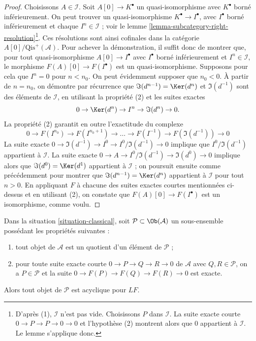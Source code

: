 \begin{proof}
Choisissons $A \in \mathcal{I}$. Soit $A[0] \to K^\bullet$ un
quasi-isomorphisme avec $K^\bullet$ borné inférieurement. On peut trouver un
quasi-isomorphisme $K^\bullet \to I^\bullet$, avec $I^\bullet$ borné
inférieurement et chaque $I^n \in \mathcal{I}$ ; voir le
lemme \ref{lemma-subcategory-right-resolution}\footnote{D'après (1),
$\mathcal{I}$ n'est pas vide. Choisissons $P$ dans $\mathcal{I}$. La suite
exacte courte $0 \to P \to P \to 0 \to 0$ et l'hypothèse (2) montrent alors
que $0$ appartient à $\mathcal{I}$. Le lemme s'applique donc.}. Ces résolutions
sont ainsi cofinales dans la catégorie
$A[0]/\text{Qis}^{+}(\mathcal{A})$. Pour achever la démonstration, il suffit
donc de montrer que, pour tout quasi-isomorphisme
$A[0] \to I^\bullet$ avec $I^\bullet$ borné inférieurement et
$I^n \in \mathcal{I}$, le morphisme
$F(A)[0] \to F(I^\bullet)$ est un quasi-isomorphisme.
Supposons pour cela que $I^n = 0$ pour $n < n_0$. On peut évidemment supposer
que $n_0 < 0$. À partir de $n = n_0$, on démontre par récurrence que
$\Im(d^{n - 1}) = \Ker(d^n)$ et $\Im(d^{-1})$ sont des éléments de
$\mathcal{I}$, en utilisant la propriété (2) et les suites exactes
$$
0 \to \Ker(d^n) \to I^n \to \Im(d^n) \to 0.
$$
La propriété (2) garantit en outre l'exactitude du complexe
$$
0 \to F(I^{n_0}) \to F(I^{n_0 + 1}) \to \ldots \to F(I^{-1}) \to
F(\Im(d^{-1})) \to 0
$$
La suite exacte
$0 \to \Im(d^{-1}) \to I^0 \to I^0/\Im(d^{-1}) \to 0$ implique que
$I^0/\Im(d^{-1})$ appartient à $\mathcal{I}$. La suite exacte
$0 \to A \to I^0/\Im(d^{-1}) \to \Im(d^0) \to 0$ implique alors que
$\Im(d^0) = \Ker(d^1)$ appartient à $\mathcal{I}$ ; on poursuit ensuite comme
précédemment pour montrer que
$\Im(d^{n - 1}) = \Ker(d^n)$ appartient à $\mathcal{I}$ pour tout $n > 0$.
En appliquant $F$ à chacune des suites exactes courtes mentionnées ci-dessus et
en utilisant (2), on constate que
$F(A)[0] \to F(I^\bullet)$ est un isomorphisme, comme voulu.
\end{proof}

\begin{lemma}
\label{lemma-subcategory-left-acyclics}
Dans la situation \ref{situation-classical}, soit
$\mathcal{P} \subset \Ob(\mathcal{A})$ un sous-ensemble possédant les
propriétés suivantes :
\begin{enumerate}
\item tout objet de $\mathcal{A}$ est un quotient d'un élément de
$\mathcal{P}$ ;
\item pour toute suite exacte courte $0 \to P \to Q \to R \to 0$ de
$\mathcal{A}$ avec $Q, R \in \mathcal{P}$, on a $P \in \mathcal{P}$ et la
suite $0 \to F(P) \to F(Q) \to F(R) \to 0$ est exacte.
\end{enumerate}
Alors tout objet de $\mathcal{P}$ est acyclique pour $LF$.
\end{lemma}

